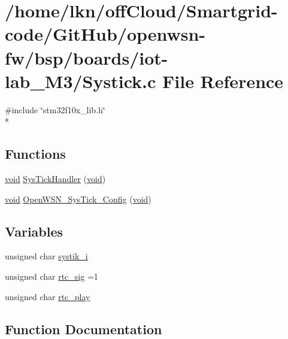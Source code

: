 \hypertarget{iot-lab___m3_2_systick_8c}{}\section{/home/lkn/off\+Cloud/\+Smartgrid-\/code/\+Git\+Hub/openwsn-\/fw/bsp/boards/iot-\/lab\+\_\+\+M3/\+Systick.c File Reference}
\label{iot-lab___m3_2_systick_8c}
{\ttfamily \#include \char`\"{}stm32f10x\+\_\+lib.\+h\char`\"{}}\\*
\subsection*{Functions}
\begin{DoxyCompactItemize}
\item 
\hyperlink{usb__devapi_8h_afabf60e7f57651d6d595a02c75f07cd0}{void} \hyperlink{iot-lab___m3_2_systick_8c_a737b0e743a1e6278e22d292c02925189}{Sys\+Tick\+Handler} (\hyperlink{usb__devapi_8h_afabf60e7f57651d6d595a02c75f07cd0}{void})
\item 
\hyperlink{usb__devapi_8h_afabf60e7f57651d6d595a02c75f07cd0}{void} \hyperlink{iot-lab___m3_2_systick_8c_a8399c4c08c30b8ab9f0b0b08d9b854ee}{Open\+W\+S\+N\+\_\+\+Sys\+Tick\+\_\+\+Config} (\hyperlink{usb__devapi_8h_afabf60e7f57651d6d595a02c75f07cd0}{void})
\end{DoxyCompactItemize}
\subsection*{Variables}
\begin{DoxyCompactItemize}
\item 
unsigned char \hyperlink{iot-lab___m3_2_systick_8c_a0eab83a5030febd8f48cd5bfa173968b}{systik\+\_\+i}
\item 
unsigned char \hyperlink{iot-lab___m3_2_systick_8c_add90cbf2f306b02a95fd2d83015f393d}{rtc\+\_\+sig} =1
\item 
unsigned char \hyperlink{iot-lab___m3_2_systick_8c_ae0a2d8ce5ed66a755934203ebdb666ac}{rtc\+\_\+play}
\end{DoxyCompactItemize}


\subsection{Function Documentation}
